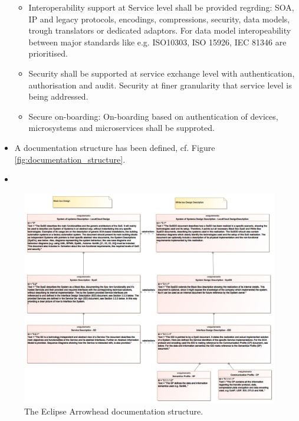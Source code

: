 \documentclass[a4paper]{arrowhead}
\begin{document}
\begin{itemize}
\begin{itemize}
    \item Interoperability support at Service level shall be provided
      regrding: SOA, IP and legacy protocols, encodings, compressions,
      security, data models, trough translators or dedicated
      adaptors. For data model interopeability between major standards
      like e.g. ISO10303, ISO 15926, IEC 81346 are prioritised.
      
    \item Security shall be supported at service exchange level with
      authentication, authorisation and audit. Security at finer
      granularity that service level is being addressed.
      
    \item Secure on-boarding: On-boarding based on authentication of
      devices, microsystems and microservices shall be supproted.
      
 

    \end{itemize}

  
    \item A documentation structure has been defined, cf. Figure
      \ref{fig:documentation_structure}.  
    \item 
    \end{itemize}
  
\begin{figure}[ht!]
   \centering
   \includegraphics[width=0.9\linewidth]{figures/documentation_structure}
   \caption{The Eclipse Arrowhead documentation structure.}
   \label{fig:technology_stack}
 \end{figure}
\end{document}
